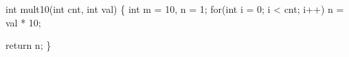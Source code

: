 \begin{minipage}{3in}
\begin{AVerb}[gobble=2,numbers=left]
  int mult10(int cnt, int val) \{ 
    int m = 10, n = 1; 
    for(int i = 0; i < cnt; i++)
      n = val * 10; \label{fig_back7_opt_loop}

    return n;
  \}
\end{AVerb}
\end{minipage}
